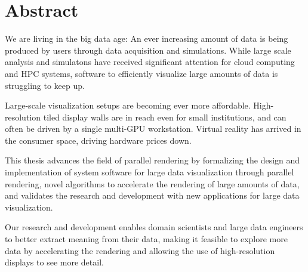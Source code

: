

\chapter*{Abstract}
We are living in the big data age: An ever increasing amount of data is being
produced by users through data acquisition and simulations. While large scale
analysis and simulatons have received significant attention for cloud computing
and HPC systems, software to efficiently visualize large amounts of data is
struggling to keep up.

Large-scale visualization setups are becoming ever more affordable.
High-resolution tiled display walls are in reach even for small institutions,
and can often be driven by a single multi-GPU workstation. Virtual reality has
arrived in the consumer space, driving hardware prices down.

This thesis advances the field of parallel rendering by formalizing the design
and implementation of system software for large data visualization through
parallel rendering, novel algorithms to accelerate the rendering of large
amounts of data, and validates the research and development with new
applications for large data visualization.

Our research and development enables domain scientists and large data
engineers to better extract meaning from their data, making it feasible to
explore more data by accelerating the rendering and allowing the use of
high-resolution displays to see more detail.

